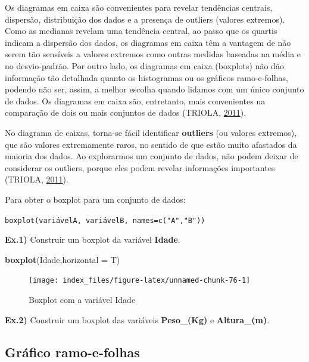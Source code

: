 \documentclass[12pt,brazil,oneside]{book}
\newenvironment{Shaded}{\begin{snugshade}}{\end{snugshade}}
\newcommand{\DataTypeTok}[1]{\textcolor[rgb]{0.13,0.29,0.53}{#1}}
\newcommand{\KeywordTok}[1]{\textcolor[rgb]{0.13,0.29,0.53}{\textbf{#1}}}
\newcommand{\NormalTok}[1]{#1}
\begin{document}
Os diagramas em caixa são convenientes para revelar tendências centrais, dispersão, distribuição dos dados e a presença de outliers (valores extremos). Como as medianas revelam uma tendência central, ao passo que os quartis indicam a dispersão dos dados, os diagramas em caixa têm a vantagem de não serem tão sensíveis a valores extremos como outras medidas baseadas na média e no desvio-padrão. Por outro lado, os diagramas em caixa (boxplots) não dão informação tão detalhada quanto os histogramas ou os gráficos ramo-e-folhas, podendo não ser, assim, a melhor escolha quando lidamos com um único conjunto de dados. Os diagramas em caixa são, entretanto, mais convenientes na comparação de dois ou mais conjuntos de dados (TRIOLA, \protect\hyperlink{ref-triola1999}{2011}).

No diagrama de caixas, torna-se fácil identificar \textbf{outliers} (ou valores extremos), que são valores extremamente raros, no sentido de que estão muito afastados da maioria dos dados. Ao explorarmos um conjunto de dados, não podem deixar de considerar os outliers, porque eles podem revelar informações importantes (TRIOLA, \protect\hyperlink{ref-triola1999}{2011}).

Para obter o boxplot para um conjunto de dados:

\texttt{boxplot(variávelA,\ variávelB,\ names=c("A","B"))}

\textbf{Ex.1)} Construir um boxplot da variável \textbf{Idade}.

\begin{Shaded}
\begin{Highlighting}[]
\KeywordTok{boxplot}\NormalTok{(Idade,}\DataTypeTok{horizontal =}\NormalTok{ T)}
\end{Highlighting}
\end{Shaded}

\begin{figure}[H]

{\centering \texttt{[image: index\_files/figure-latex/unnamed-chunk-76-1]} 

}

\caption{Boxplot com a variável Idade}\label{fig:unnamed-chunk-76}
\end{figure}

\textbf{Ex.2)} Construir um boxplot das variáveis \textbf{Peso\_(Kg)} e \textbf{Altura\_(m)}.

\hypertarget{grafico-ramo-e-folhas}{%
\subsection{Gráfico ramo-e-folhas}\label{grafico-ramo-e-folhas}}
\end{document}
